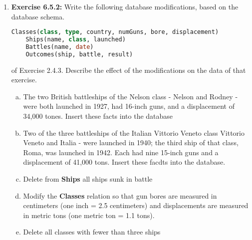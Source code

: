 \documentclass[12pt]{article}
\begin{document}
\begin{enumerate}[1.]
    \item \textbf{Exercise 6.5.2:} Write the following database modifications, based
    on the database schema.

    \bigskip

    \begin{lstlisting}[language=SQL]
    Classes(class, type, country, numGuns, bore, displacement)
    Ships(name, class, launched)
    Battles(name, date)
    Outcomes(ship, battle, result)
    \end{lstlisting}

    of Exercise 2.4.3. Describe the effect of the modifications on the data of that
    exercise.

    \bigskip

    \begin{enumerate}[a)]
        \item The two British battleships of the Nelson class - Nelson and Rodney -
        were both launched in 1927, had 16-inch guns, and a displacement of 34,000
        tones. Insert these facts into the database
        \item Two of the three battleships of the Italian Vittorio Veneto class
        Vittorio Veneto and Italia - were launched in 1940; the third ship of that
        class, Roma, was launched in 1942. Each had nine 15-inch guns and a displacement
        of 41,000 tons. Insert these facdts into the database.
        \item Delete from \textbf{Ships} all ships sunk in battle
        \item Modify the \textbf{Classes} relation so that gun bores are measured
        in centimeters (one inch = 2.5 centimeters) and displacements are measured in
        metric tons (one metric ton = 1.1 tons).
        \item Delete all classes with fewer than three ships
    \end{enumerate}

\end{enumerate}
\end{document}
